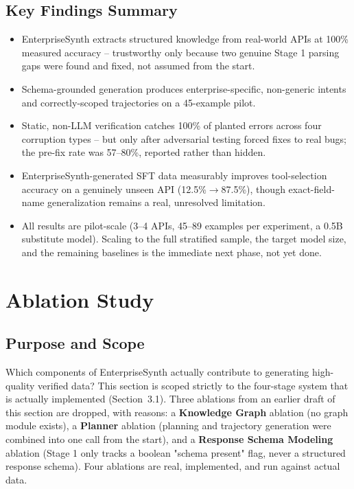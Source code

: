 \documentclass[11pt]{article}
\begin{document}
\subsection{Key Findings Summary}
\begin{itemize}
    \item EnterpriseSynth extracts structured knowledge from real-world APIs at 100\% measured
    accuracy -- trustworthy only because two genuine Stage 1 parsing gaps were found and fixed,
    not assumed from the start.
    \item Schema-grounded generation produces enterprise-specific, non-generic intents and
    correctly-scoped trajectories on a 45-example pilot.
    \item Static, non-LLM verification catches 100\% of planted errors across four corruption
    types -- but only after adversarial testing forced fixes to real bugs; the pre-fix rate was
    57--80\%, reported rather than hidden.
    \item EnterpriseSynth-generated SFT data measurably improves tool-selection accuracy on a
    genuinely unseen API (12.5\%$\rightarrow$87.5\%), though exact-field-name generalization
    remains a real, unresolved limitation.
    \item All results are pilot-scale (3--4 APIs, 45--89 examples per experiment, a 0.5B
    substitute model). Scaling to the full stratified sample, the target model size, and the
    remaining baselines is the immediate next phase, not yet done.
\end{itemize}

\section{Ablation Study}

\subsection{Purpose and Scope}
Which components of EnterpriseSynth actually contribute to generating high-quality verified data?
This section is scoped strictly to the four-stage system that is actually implemented
(Section~3.1). Three ablations from an earlier draft of this section are dropped, with reasons:
a \textbf{Knowledge Graph} ablation (no graph module exists), a \textbf{Planner} ablation
(planning and trajectory generation were combined into one call from the start), and a
\textbf{Response Schema Modeling} ablation (Stage 1 only tracks a boolean "schema present" flag,
never a structured response schema). Four ablations are real, implemented, and run against actual
data.
\end{document}
